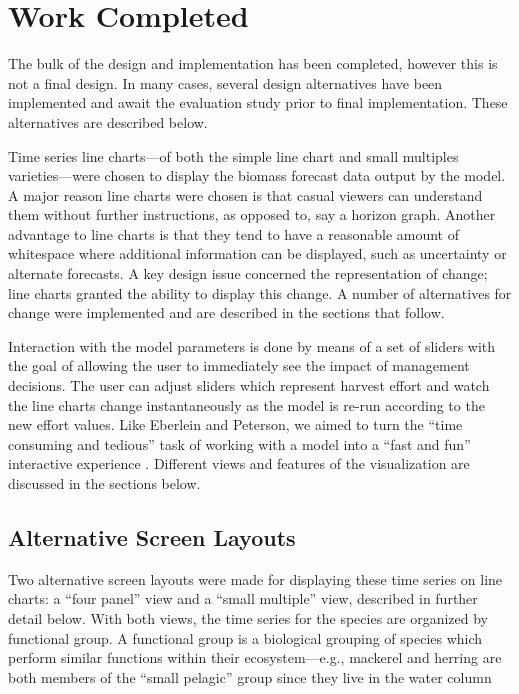 \chapter{Work Completed}

The bulk of the design and implementation has been completed, however this is not a final design.  In many cases, several design alternatives have been implemented and await the evaluation study prior to final implementation.  These alternatives are described below.

Time series line charts---of both the simple line chart and small multiples varieties---were chosen to display the biomass forecast data output by the model.  A major reason line charts were chosen is that casual viewers can understand them without further instructions, as opposed to, say a horizon graph.  Another advantage to line charts is that they tend to have a reasonable amount of whitespace where additional information can be displayed, such as uncertainty or alternate forecasts. A key design issue concerned the representation of change; line charts granted the ability to display this change.  A number of alternatives for change were implemented and are described in the sections that follow.

Interaction with the model parameters is done by means of a set of sliders with the goal of allowing the user to immediately see the impact of management decisions.  The user can adjust sliders which represent harvest effort and watch the line charts change instantaneously as the model is re-run according to the new effort values.  Like Eberlein and Peterson, we aimed to turn the ``time consuming and tedious'' task of working with a model into a ``fast and fun'' interactive experience \cite{eberlein1992}.  Different views and features of the visualization are discussed in the sections below.  

\section{Alternative Screen Layouts}

Two alternative screen layouts were made for displaying these time series on line charts: a ``four panel'' view and a ``small multiple'' view, described in further detail below.  With both views, the time series for the species are organized by functional group.  A functional group is a biological grouping of species which perform similar functions within their ecosystem---e.g., mackerel and herring are both members of the ``small pelagic'' group since they live in the water column

